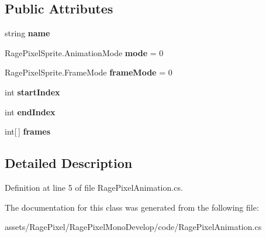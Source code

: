 \subsection*{Public Attributes}
\begin{DoxyCompactItemize}
\item 
\hypertarget{class_rage_pixel_animation_a4038df9daf7a413b5646cee41b182911}{string {\bfseries name}}\label{class_rage_pixel_animation_a4038df9daf7a413b5646cee41b182911}

\item 
\hypertarget{class_rage_pixel_animation_a24da08f4d3a777db979e068e8f115d8a}{Rage\-Pixel\-Sprite.\-Animation\-Mode {\bfseries mode} = 0}\label{class_rage_pixel_animation_a24da08f4d3a777db979e068e8f115d8a}

\item 
\hypertarget{class_rage_pixel_animation_a64485d447bc004c4ba8eade67219680c}{Rage\-Pixel\-Sprite.\-Frame\-Mode {\bfseries frame\-Mode} = 0}\label{class_rage_pixel_animation_a64485d447bc004c4ba8eade67219680c}

\item 
\hypertarget{class_rage_pixel_animation_a7e933354127c1d51515ff8ee568a1cdd}{int {\bfseries start\-Index}}\label{class_rage_pixel_animation_a7e933354127c1d51515ff8ee568a1cdd}

\item 
\hypertarget{class_rage_pixel_animation_a9502946898c421494831e3cb8cb7981d}{int {\bfseries end\-Index}}\label{class_rage_pixel_animation_a9502946898c421494831e3cb8cb7981d}

\item 
\hypertarget{class_rage_pixel_animation_a1cf893f3f61d68ca236b4347088f3cde}{int\mbox{[}$\,$\mbox{]} {\bfseries frames}}\label{class_rage_pixel_animation_a1cf893f3f61d68ca236b4347088f3cde}

\end{DoxyCompactItemize}


\subsection{Detailed Description}


Definition at line 5 of file Rage\-Pixel\-Animation.\-cs.



The documentation for this class was generated from the following file\-:\begin{DoxyCompactItemize}
\item 
assets/\-Rage\-Pixel/\-Rage\-Pixel\-Mono\-Develop/code/Rage\-Pixel\-Animation.\-cs\end{DoxyCompactItemize}
